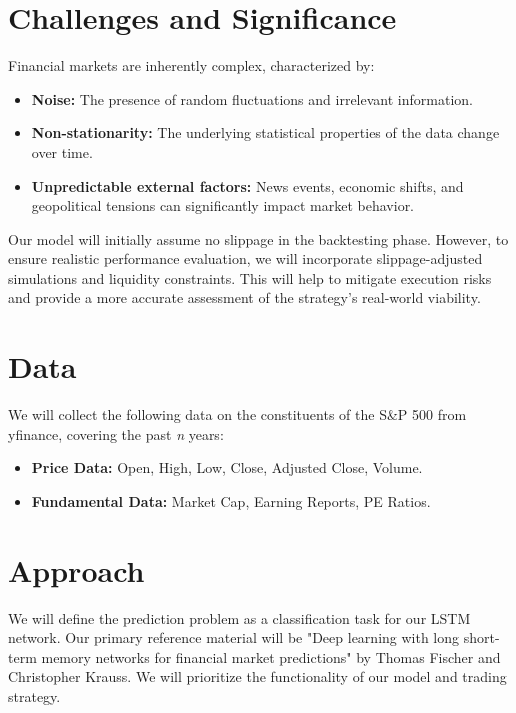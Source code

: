 \section{Challenges and Significance}

Financial markets are inherently complex, characterized by:

\begin{itemize}
\item \textbf{Noise:} The presence of random fluctuations and irrelevant information.
\item \textbf{Non-stationarity:} The underlying statistical properties of the data change over time.
\item \textbf{Unpredictable external factors:} News events, economic shifts, and geopolitical tensions can significantly impact market behavior.
\end{itemize}

Our model will initially assume no slippage in the backtesting phase. However, to ensure realistic performance evaluation, we will incorporate slippage-adjusted simulations and liquidity constraints. This will help to mitigate execution risks and provide a more accurate assessment of the strategy's real-world viability.

\section{Data}

We will collect the following data on the constituents of the S\&P 500 from yfinance, covering the past \textit{n} years:

\begin{itemize}
\item \textbf{Price Data:} Open, High, Low, Close, Adjusted Close, Volume.
\item \textbf{Fundamental Data:} Market Cap, Earning Reports, PE Ratios.
\end{itemize}

\section{Approach}

We will define the prediction problem as a classification task for our LSTM network. Our primary reference material will be "Deep learning with long short-term memory networks for financial market predictions" by Thomas Fischer and Christopher Krauss. We will prioritize the functionality of our model and trading strategy.

